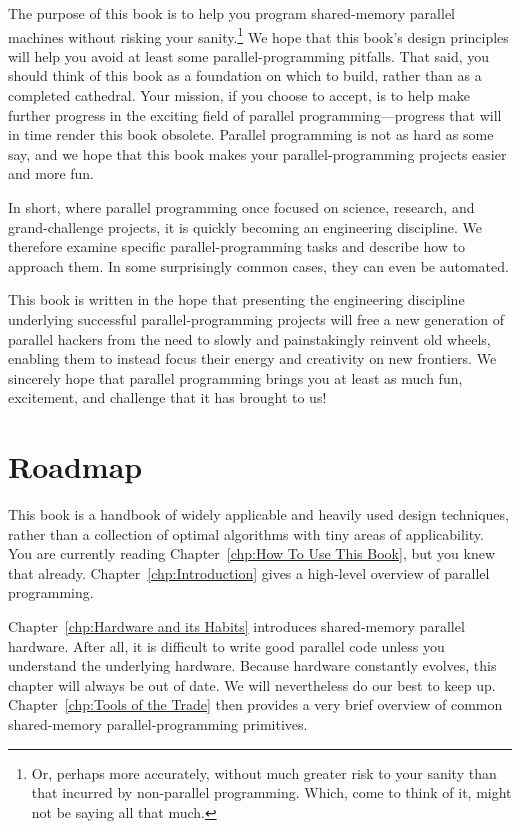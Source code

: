 

The purpose of this book is to help you program
shared-memory parallel machines without risking your sanity.\footnote{
	Or, perhaps more accurately, without much greater risk to your
	sanity than that incurred by non-parallel programming.
	Which, come to think of it, might not be saying all that much.}
We hope that this book's design principles will help you avoid at least some
parallel-programming pitfalls.
That said, you should think of this book as a foundation on which to build,
rather than as a completed cathedral.
Your mission, if you choose to accept, is to help make further progress
in the exciting field of parallel programming---progress that will
in time render this book obsolete.
Parallel programming is not as hard as some say, and we hope
that this book makes your parallel-programming projects easier and
more fun.

In short, where parallel programming once focused on science, research,
and grand-challenge projects, it is quickly becoming an engineering
discipline.
We therefore examine specific parallel-programming tasks
and describe how to approach them.
In some surprisingly common cases, they can even be automated.

This book is written in the hope that presenting the engineering
discipline underlying successful
parallel-programming projects will free a new generation of parallel hackers
from the need to slowly and painstakingly reinvent old wheels, enabling
them to instead focus their energy and creativity on new frontiers.
We sincerely hope that parallel programming brings you at least as
much fun, excitement, and challenge that it has brought to us!

\section{Roadmap}
\label{sec:howto:Roadmap}

This book is a handbook of widely applicable and heavily
used design techniques, rather than
a collection of optimal algorithms with tiny areas of applicability.
You are currently reading Chapter~\ref{chp:How To Use This Book}, but
you knew that already.
Chapter~\ref{chp:Introduction} gives a high-level overview of parallel
programming.

Chapter~\ref{chp:Hardware and its Habits} introduces shared-memory
parallel hardware.
After all, it is difficult to write good parallel code unless you
understand the underlying hardware.
Because hardware constantly evolves, this chapter will always be
out of date.
We will nevertheless do our best to keep up.
Chapter~\ref{chp:Tools of the Trade} then provides a very brief overview
of common shared-memory parallel-programming primitives.

